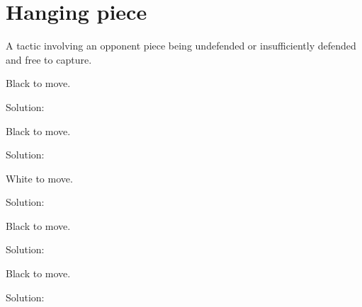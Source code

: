 \documentclass{book}
\begin{document}
\section{Hanging piece}
A tactic involving an opponent piece being undefended or insufficiently defended and free to capture.\begin{multicols}{2} 
\begin{samepage} 
\newgame 


 
\showboard
 
 Black to move. 
 
Solution: 
 
\end{samepage}\begin{samepage} 
\newgame 


 
\showboard
 
 Black to move. 
 
Solution: 
 
\end{samepage}\begin{samepage} 
\newgame 


 
\showboard
 
 White to move. 
 
Solution: 
 
\end{samepage}\begin{samepage} 
\newgame 


 
\showboard
 
 Black to move. 
 
Solution: 
 
\end{samepage}\begin{samepage} 
\newgame 


 
\showboard
 
 Black to move. 
 
Solution: 
 
\end{samepage}\end{multicols} 
\newpage 
\end{document}
